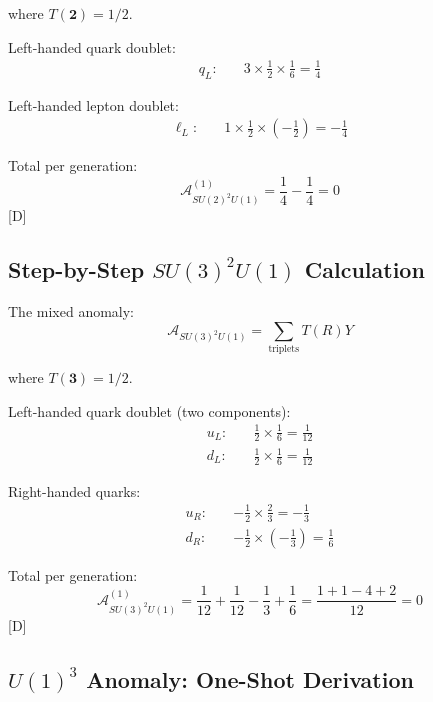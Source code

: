 \documentclass[11pt,a4paper]{article}
\newcommand{\tagD}{\textcolor{blue!70!black}{[D]}}
\begin{document}
where $T(\mathbf{2}) = 1/2$.

Left-handed quark doublet:
\begin{align}
\label{eq:qL-su2u1}
q_L: \quad & 3 \times \frac{1}{2} \times \frac{1}{6} = \frac{1}{4}
\end{align}

Left-handed lepton doublet:
\begin{align}
\label{eq:lL-su2u1}
\ell_L: \quad & 1 \times \frac{1}{2} \times \left(-\frac{1}{2}\right) = -\frac{1}{4}
\end{align}

Total per generation:
\begin{equation}
\label{eq:su2u1-per-gen}
\mathcal{A}_{SU(2)^2 U(1)}^{(1)} = \frac{1}{4} - \frac{1}{4} = 0
\end{equation}
\tagD

\subsection{Step-by-Step $SU(3)^2 U(1)$ Calculation}

The mixed anomaly:
\begin{equation}
\label{eq:su3u1-def}
\mathcal{A}_{SU(3)^2 U(1)} = \sum_{\text{triplets}} T(R) Y
\end{equation}

where $T(\mathbf{3}) = 1/2$.

Left-handed quark doublet (two components):
\begin{align}
\label{eq:qL-su3u1-up}
u_L: \quad & \frac{1}{2} \times \frac{1}{6} = \frac{1}{12} \\
\label{eq:qL-su3u1-down}
d_L: \quad & \frac{1}{2} \times \frac{1}{6} = \frac{1}{12}
\end{align}

Right-handed quarks:
\begin{align}
\label{eq:uR-su3u1}
u_R: \quad & -\frac{1}{2} \times \frac{2}{3} = -\frac{1}{3} \\
\label{eq:dR-su3u1}
d_R: \quad & -\frac{1}{2} \times \left(-\frac{1}{3}\right) = \frac{1}{6}
\end{align}

Total per generation:
\begin{equation}
\label{eq:su3u1-per-gen}
\mathcal{A}_{SU(3)^2 U(1)}^{(1)} = \frac{1}{12} + \frac{1}{12} - \frac{1}{3} + \frac{1}{6} = \frac{1 + 1 - 4 + 2}{12} = 0
\end{equation}
\tagD

\subsection{$U(1)^3$ Anomaly: One-Shot Derivation}
\label{app:u1-3-oneshot}
\end{document}
